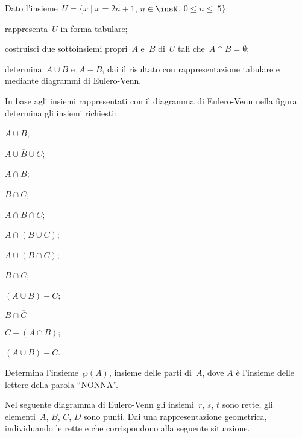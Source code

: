 \begin{esercizio}
Dato l'insieme~$U=\{x\mid x=2n+1$, $n\in\insN$, $0\le n\le~5\}$:

\begin{enumeratea}
\item rappresenta~$U$ in forma tabulare;
\item costruisci due sottoinsiemi propri~$A$ e~$B$ di~$U$ tali che~$A\cap B=\emptyset $;
\item determina~$A\cup B$ e~$A-B$, dai il risultato con rappresentazione tabulare e mediante diagrammi di
Eulero-Venn.
\end{enumeratea}
\end{esercizio}
\pagebreak
\begin{esercizio}
In base agli insiemi rappresentati con il diagramma di Eulero-Venn nella figura determina gli insiemi richiesti:
\begin{multicols}{2}
\begin{enumeratea}
\item $A\cup B$;
\item $\overline{A\cup B\cup C}$;
\item $A\cap B$;
\item $B\cap C$;
\item $A\cap B\cap C$;
\item $A\cap (B\cup C)$;
\item $A\cup (B\cap C)$;
\item $B\cap \overline{C}$;
\item $(A\cup B)-C$;
\item $B\cap \overline{C}$
\item $C-(A\cap B)$;
\item $\overline{(A\cup B)}-C$.
\end{enumeratea}
\begin{center}
 
\end{center}
\end{multicols}
\end{esercizio}


\begin{esercizio}
Determina l'insieme~$\wp(A)$, insieme delle parti di~$A$, dove $A$ è l'insieme delle lettere della parola ``NONNA''.
\end{esercizio}

\begin{esercizio}
Nel seguente diagramma di Eulero-Venn gli insiemi~$r$, $s$, $t$
sono rette, gli elementi~$A$, $B$, $C$, $D$ sono punti. Dai una
rappresentazione geometrica, individuando le rette e che corrispondono
alla seguente situazione.

\begin{center}
 
\end{center}
\end{esercizio}

